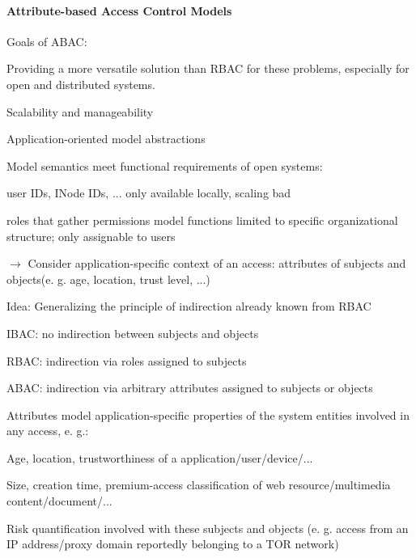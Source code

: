 \documentclass[a4paper]{article}
\begin{document}
\begin{multicols}{3}
    \paragraph{Attribute-based Access Control Models}
    Goals of ABAC:
    \begin{itemize*}
        \item Providing a more versatile solution than RBAC for these problems, especially for open and distributed systems.
        \begin{itemize*}
            \item Scalability and manageability
            \item Application-oriented model abstractions
            \item Model semantics meet functional requirements of open systems:
            \begin{itemize*}
                \item user IDs, INode IDs, ... only available locally, scaling bad
                \item roles that gather permissions model functions limited to specific organizational structure; only assignable to users
            \end{itemize*}
            \item $\rightarrow$ Consider application-specific context of an access: attributes of subjects and objects(e. g. age, location, trust level, ...)
        \end{itemize*}
    \end{itemize*}

    Idea: Generalizing the principle of indirection already known from RBAC
    \begin{itemize*}
        \item IBAC: no indirection between subjects and objects
        \item RBAC: indirection via roles assigned to subjects
        \item ABAC: indirection via arbitrary attributes assigned to subjects or objects
        \item Attributes model application-specific properties of the system entities involved in any access, e. g.:
        \begin{itemize*}
            \item Age, location, trustworthiness of a application/user/device/...
            \item Size, creation time, premium-access classification of web resource/multimedia content/document/...
            \item Risk quantification involved with these subjects and objects (e. g. access from an IP address/proxy domain reportedly belonging to a TOR network)
        \end{itemize*}
    \end{itemize*}


\end{multicols}
\end{document}
